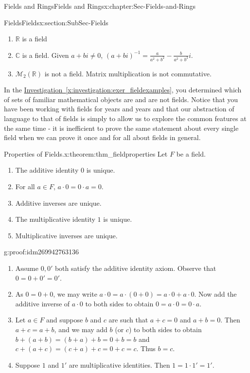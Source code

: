 \documentclass[oneside,10pt,]{book}
\numberwithin{equation}{section}
\def\C{{\mathbb C}}
\def\R{{\mathbb R}}
\begin{document}
\begin{chapterptx}{Fields and Rings}{}{Fields and Rings}{}{}{x:chapter:Sec-Fields-and-Rings}
\begin{sectionptx}{Fields}{}{Fields}{}{}{x:section:SubSec-Fields}
\begin{enumerate}
\item{}\(\R\) is a field%
\item{}\(\C\) is a field. Given \(a+bi\ne 0\), \((a+bi)^{-1} = \frac{a}{a^2 + b^2} - \frac{b}{a^2 + b^2} i\).%
\item{}\(\mathcal{M}_2(\R)\) is not a field. Matrix multiplication is not commutative.%
\end{enumerate}
%
In the \hyperref[x:investigation:exer_fieldexamples]{Investigation~\ref{x:investigation:exer_fieldexamples}}, you determined which of sets of familiar mathematical objects are and are not fields. Notice that you have been working with fields for years and years and that our abstraction of language to that of fields is simply to allow us to explore the common features at the same time - it is inefficient to prove the same statement about every single field when we can prove it once and for all about fields in general.%
\begin{theorem}{Properties of Fields.}{}{x:theorem:thm_fieldproperties}%
Let \(F\) be a field.%
\begin{enumerate}
\item{}The additive identity \(0\) is unique.%
\item{}For all \(a\in F\), \(a \cdot 0 = 0\cdot a = 0\).%
\item{}Additive inverses are unique.%
\item{}The multiplicative identity \(1\) is unique.%
\item{}Multiplicative inverses are unique.%
\end{enumerate}
%
\end{theorem}
\begin{proofptx}{}{g:proof:idm269942763136}
%
\begin{enumerate}
\item{}Assume \(0, 0'\) both satisfy the additive identity axiom. Observe that \(0 = 0 + 0' = 0'\).%
\item{}As \(0 = 0 + 0\), we may write \(a\cdot 0 = a\cdot (0 + 0) = a\cdot 0 + a \cdot 0\). Now add the additive inverse of \(a\cdot 0\) to both sides to obtain \(0 = a \cdot 0 = 0\cdot a\).%
\item{}Let \(a\in F\) and suppose \(b\) and \(c\) are such that \(a+c = 0\) and \(a+b = 0\). Then \(a+c = a+b\), and we may add \(b\) (or \(c\)) to both sides to obtain \(b+(a+b) = (b+a)+b = 0 + b = b\) and \(c+(a+c) = (c+a)+c = 0 + c = c\). Thus \(b=c\).%
\item{}Suppose \(1\) and \(1'\) are multiplicative identities. Then \(1 = 1 \cdot 1' = 1'\).%

\end{enumerate}
\end{proofptx}
\end{sectionptx}
\end{chapterptx}
\end{document}
